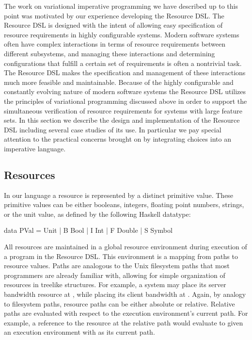 \documentclass[letterpaper,10pt,onecolumn]{article}
\begin{document}
The work on variational imperative programming we have described up to this point was motivated
by our experience developing the Resource DSL. The Resource DSL is designed with the intent of
allowing easy specification of resource requirements in highly configurable systems. Modern software
systems often have complex interactions in terms of resource requirements between different subsystems,
and managing these interactions and determining configurations that fulfill a certain set of requirements
is often a nontrivial task. The Resource DSL makes the specification and management
of these interactions much more feasible and maintainable. Because of the highly configurable and constantly evolving
nature of modern software systems the Resource DSL utilizes the principles of variational programming
discussed above in order to support the simultaneous verification of resource requirements for
systems with large feature sets. In this section we describe the design and implementation of the
Resource DSL including several case studies of its use. In particular we pay special attention to the
practical concerns brought on by integrating choices into an imperative language.

\subsection{Resources}

In our language a resource is represented by a distinct primitive value. These primitive values
can be either booleans, integers, floating point numbers, strings, or the unit value, as defined
by the following Haskell datatype:

\begin{program}
data PVal
     = Unit
     | B Bool
     | I Int
     | F Double
     | S Symbol
\end{program}

All resources are maintained in a global resource environment during execution of a program
in the Resource DSL. This environment is a mapping from paths to resource values. Paths are
analogous to the Unix filesystem paths that most programmers are already familiar with, allowing for
simple organization of resources in treelike structures. For example, a system may place its server
bandwidth resource at , while placing its client bandwidth at .
Again, by analogy to filesystem paths, resource paths can be either absolute or relative. Relative paths are
evaluated with respect to the execution environment's current path. For example, a reference to the resource
at the relative path  would evaluate to 
given an execution environment with  as its current path.
\end{document}
